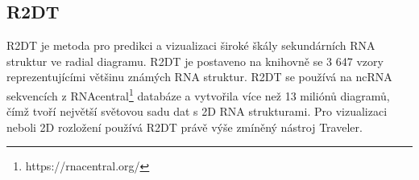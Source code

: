 \subsection{R2DT} 

R2DT\cite{R2DT2021} je metoda pro predikci a vizualizaci široké škály
sekundárních RNA struktur ve radial diagramu. R2DT je postaveno na
knihovně se 3 647 vzory reprezentujícími většinu známých RNA struktur. R2DT se
používá na ncRNA sekvencích z RNAcentral\footnote{https://rnacentral.org/}
databáze a vytvořila více než 13 miliónů diagramů, čímž tvoří největší světovou
sadu dat s 2D RNA strukturami. Pro vizualizaci neboli 2D rozložení používá R2DT
právě výše zmíněný nástroj Traveler.
